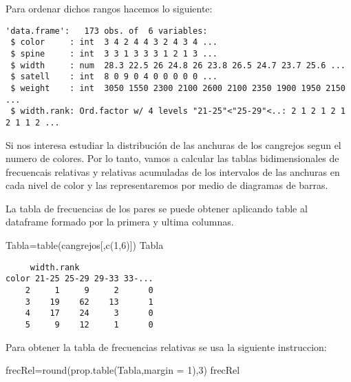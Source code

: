 \documentclass[
]{article}
\newenvironment{Shaded}{\begin{snugshade}}{\end{snugshade}}
\newcommand{\AttributeTok}[1]{\textcolor[rgb]{0.77,0.63,0.00}{#1}}
\newcommand{\DecValTok}[1]{\textcolor[rgb]{0.00,0.00,0.81}{#1}}
\newcommand{\FunctionTok}[1]{\textcolor[rgb]{0.00,0.00,0.00}{#1}}
\newcommand{\NormalTok}[1]{#1}
\newcommand{\OtherTok}[1]{\textcolor[rgb]{0.56,0.35,0.01}{#1}}
\newcommand{\SpecialCharTok}[1]{\textcolor[rgb]{0.00,0.00,0.00}{#1}}
\begin{document}
Para ordenar dichos rangos hacemos lo siguiente:

\begin{Shaded}
\end{Shaded}

\begin{verbatim}
'data.frame':   173 obs. of  6 variables:
 $ color     : int  3 4 2 4 4 3 2 4 3 4 ...
 $ spine     : int  3 3 1 3 3 3 1 2 1 3 ...
 $ width     : num  28.3 22.5 26 24.8 26 23.8 26.5 24.7 23.7 25.6 ...
 $ satell    : int  8 0 9 0 4 0 0 0 0 0 ...
 $ weight    : int  3050 1550 2300 2100 2600 2100 2350 1900 1950 2150 ...
 $ width.rank: Ord.factor w/ 4 levels "21-25"<"25-29"<..: 2 1 2 1 2 1 2 1 1 2 ...
\end{verbatim}

Si nos interesa estudiar la distribución de las anchuras de los
cangrejos segun el numero de colores. Por lo tanto, vamos a calcular las
tablas bidimensionales de frecuencais relativas y relativas acumuladas
de los intervalos de las anchuras en cada nivel de color y las
representaremos por medio de diagramas de barras.

La tabla de frecuencias de los pares se puede obtener aplicando table al
dataframe formado por la primera y ultima columnas.

\begin{Shaded}
\begin{Highlighting}[]
\NormalTok{Tabla}\OtherTok{=}\FunctionTok{table}\NormalTok{(cangrejos[,}\FunctionTok{c}\NormalTok{(}\DecValTok{1}\NormalTok{,}\DecValTok{6}\NormalTok{)])}
\NormalTok{Tabla}
\end{Highlighting}
\end{Shaded}

\begin{verbatim}
     width.rank
color 21-25 25-29 29-33 33-...
    2     1     9     2      0
    3    19    62    13      1
    4    17    24     3      0
    5     9    12     1      0
\end{verbatim}

Para obtener la tabla de frecuencias relativas se usa la siguiente
instruccion:

\begin{Shaded}
\begin{Highlighting}[]
\NormalTok{frecRel}\OtherTok{=}\FunctionTok{round}\NormalTok{(}\FunctionTok{prop.table}\NormalTok{(Tabla,}\AttributeTok{margin =} \DecValTok{1}\NormalTok{),}\DecValTok{3}\NormalTok{)}
\NormalTok{frecRel}
\end{Highlighting}
\end{Shaded}
\end{document}
